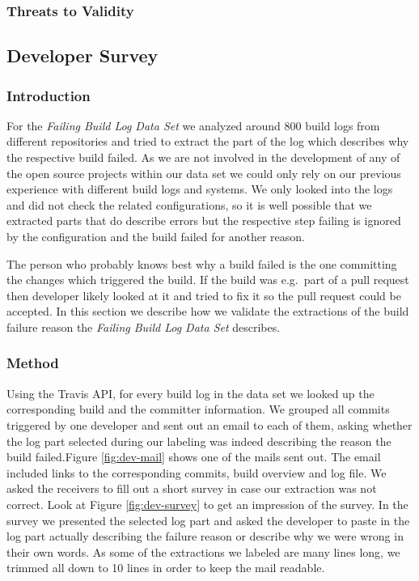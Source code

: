 \documentclass[\myrootdir/main.tex]{subfiles}
\begin{document}
\subsubsection{Threats to Validity}

\subsection{Developer Survey}
\subsubsection{Introduction}
For the \emph{Failing Build Log Data Set} we analyzed around 800 build logs from different repositories and tried to extract the part of the log which describes why the respective build failed.
As we are not involved in the development of any of the open source projects within our data set we could only rely on our previous experience with different build logs and systems.
We only looked into the logs and did not check the related configurations, so it is well possible that we extracted parts that do describe errors but the respective step failing is ignored by the configuration and the build failed for another reason.

The person who probably knows best why a build failed is the one committing the changes which triggered the build.
If the build was e.g.\ part of a pull request then developer likely looked at it and tried to fix it so the pull request could be accepted.
In this section we describe how we validate the extractions of the build failure reason the \emph{Failing Build Log Data Set} describes.
\subsubsection{Method}
Using the Travis API, for every build log in the data set we looked up the corresponding build and the committer information.
We grouped all commits triggered by one developer and sent out an email to each of them, asking whether the log part selected during our labeling was indeed describing the reason the build failed.Figure \ref{fig:dev-mail} shows one of the mails sent out.
The email included links to the corresponding commits, build overview and log file.
We asked the receivers to fill out a short survey in case our extraction was not correct.
Look at Figure \ref{fig:dev-survey} to get an impression of the survey.
In the survey we presented the selected log part and asked the developer to paste in the log part actually describing the failure reason or describe why we were wrong in their own words.
As some of the extractions we labeled are many lines long, we trimmed all down to 10 lines in order to keep the mail readable.
\end{document}
